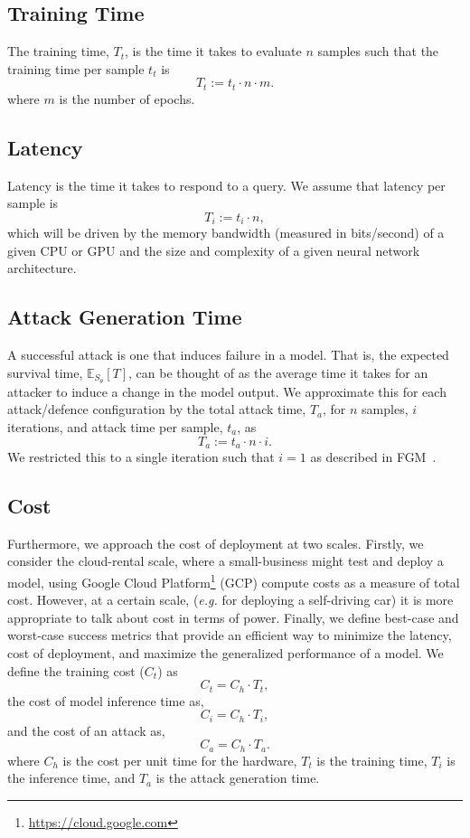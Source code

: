 \documentclass[conference]{IEEEtran}
\begin{document}
\subsection{Training Time}
The training time, $T_t$, is the time it takes to evaluate $n$ samples such that the training time per sample $t_t$ is
$$
    T_t := t_t \cdot n  \cdot m.
$$
where $m$ is the number of epochs.

\subsection{Latency}
Latency is the time it takes to respond to a query. We assume that latency per sample is
$$
    T_i := t_i \cdot n,
$$
which will be driven by the memory bandwidth (measured in bits/second) of a given CPU or GPU and the size\cite{vgg} and complexity\cite{resnet} of a given neural network architecture.


\subsection{Attack Generation Time}
A successful attack is one that induces failure in a model. That is, the expected survival time, $\mathbb{E}_{S_\theta}[T]$, can be thought of as the average time it takes for an attacker to induce a change in the model output. We approximate this for each attack/defence configuration by the total attack time, $T_a$, for $n$ samples, $i$ iterations, and attack time per sample, $t_a$, as
\begin{equation}
    \label{attack_time}
    T_a := t_a \cdot n \cdot i.
\end{equation}
We restricted this to a single iteration such that $i =1$ as described in FGM~\cite{fgm}.


\subsection{Cost}
Furthermore, we approach the cost of deployment at two scales. Firstly, we consider the cloud-rental scale, where a small-business might test and deploy a model, using Google Cloud Platform\footnote{\href{https://cloud.google.com}{https://cloud.google.com}} (GCP) compute costs as a measure of total cost. However, at a certain scale, (\textit{e.g.} for deploying a self-driving car) it is  more appropriate to talk about cost in terms of power. Finally, we define best-case and worst-case success metrics that provide an efficient way to minimize the latency, cost of deployment, and 
maximize the generalized performance of a model. We define the training cost ($C_t$) as
$$
    C_t = C_h \cdot T_t,
    \label{eq:cost_training}
$$
the cost of model inference time as,
$$
    C_i = C_h \cdot T_i,
    \label{eq:cost_inference}
$$
and the cost of an attack as,
$$
    C_a = C_h \cdot T_a.
    \label{eq:cost_attack}
$$
where $C_h$ is the cost per unit time for the hardware, $T_t$ is the training time, $T_i$ is the inference time, and $T_a$ is the attack generation time.
\end{document}
